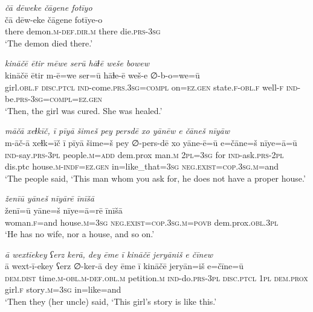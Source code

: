 \ea \label{ZP.81}
\textit{čā dēweke čāgene fotīyo} \\ 
\gll čā dēw-eke čāgene fotīye-o \\ 
 there demon\textsc{.m}\textsc{-def}\textsc{.dir}\textsc{.m} there die\textsc{.prs}\textsc{-3sg} \\ 
\glt `The demon died there.'
\z 
 
\ea \label{ZP.82}
\textit{kināčē ētir mēwe serū hāɫē weše bowew} \\ 
\gll kināčē ētir m-ē=we ser=ū hāɫe-ē weš-e ∅-b-o=we=ū \\ 
 girl\textsc{.obl}\textsc{.f} \textsc{disc.ptcl} \textsc{ind-}come\textsc{.prs}\textsc{.3sg}\textsc{=compl} on\textsc{\textsc{=ez.gen}} state\textsc{.f}\textsc{-obl}\textsc{.f} well\textsc{-f} \textsc{ind-}be\textsc{.prs}\textsc{-3sg}\textsc{=compl}\textsc{\textsc{=ez.gen}} \\ 
\glt `Then, the girl was cured. She was healed.'
\z 
 
\ea \label{ZP.86}
\textit{māčā xeɫkīč, ī pīyā šimeš pey persdē xo yānēw e čāneš nīyāw} \\ 
\gll m-āč-ā xeɫk=īč ī pīyā šime=š pey ∅-pers-dē xo yāne-ē=ū e=čāne=š nīye=ā=ū \\ 
 \textsc{ind-}say\textsc{.prs}\textsc{-3pl} people\textsc{.m}\textsc{=add} dem.prox man\textsc{.m} \textsc{2pl}\textsc{=3sg} for \textsc{ind-}ask\textsc{.prs}-\textsc{2pl} dis.ptc house\textsc{.m}\textsc{-indf}\textsc{\textsc{=ez.gen}} in=like\_that\textsc{=3sg} \textsc{\textsc{neg.}exist}\textsc{=cop}\textsc{.3sg}\textsc{.m}=and \\ 
\glt `The people said, ‘This man whom you ask for, he does not have a proper house.'
\z 
 
\ea \label{ZP.87}
\textit{ženīū yāneš nīyārē īnīšā} \\ 
\gll ženī=ū yāne=š nīye=ā=rē īnīšā \\ 
 woman\textsc{.f}=and house\textsc{.m}\textsc{=3sg} \textsc{\textsc{neg.}exist}\textsc{=cop}\textsc{.3sg}\textsc{.m}\textsc{=\textsc{povb}} dem.prox\textsc{.obl}\textsc{.3pl} \\ 
\glt `He has no wife, nor a house, and so on.'
\z 
 
\ea \label{ZP.88}
\textit{ā wextīekey ʕerz kerā, dey ēme ī kināčē jeryāniš e čīnew} \\ 
\gll ā wext-ī-ekey ʕerz ∅-ker-ā dey ēme ī kināčē jeryān=iš e=čīne=ū \\ 
 \textsc{dem.dist} time\textsc{.m}\textsc{-obl}\textsc{.m}\textsc{-def}\textsc{.obl}\textsc{.m} petition\textsc{.m} \textsc{ind-}do\textsc{.prs}\textsc{-3pl} \textsc{disc.ptcl} \textsc{1pl} \textsc{dem.prox} girl\textsc{.f} story\textsc{.m}\textsc{=3sg} in=like=and \\ 
\glt `Then they (her uncle) said, ‘This girl’s story is like this.'
\z 
 
